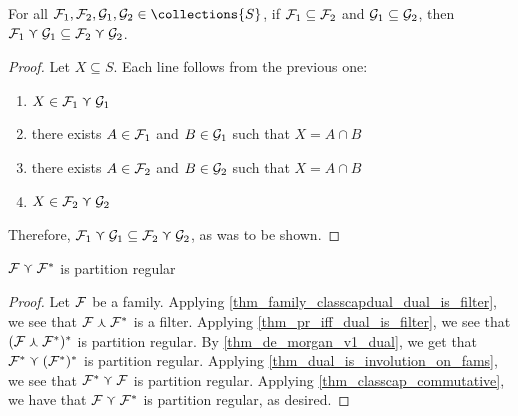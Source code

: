 \begin{theorem}
    \label{thm_classcap_monotone}
    For all $\family_1, \family_2, \familytwo_1, \familytwo_2 \in \collections{S}$, if $\mathcal{F}_1 \subseteq \mathcal{F}_2$ and $\mathcal{G}_1 \subseteq \mathcal{G}_2$, then $\mathcal{F}_1 \curlyvee \mathcal{G}_1 \subseteq \mathcal{F}_2 \curlyvee \mathcal{G}_2$.
\end{theorem}

\begin{proof}


     Let $X \subseteq S$.  Each line follows from the previous one:
    \begin{enumerate}
        \item $X \in \mathcal{F}_1 \curlyvee \mathcal{G}_1$
        \item there exists $A \in \mathcal{F}_1$ and $B \in \mathcal{G}_1$ such that $X = A \cap B$
        \item there exists $A \in \mathcal{F}_2$ and $B \in \mathcal{G}_2$ such that $X = A \cap B$
        \item $X \in \mathcal{F}_2 \curlyvee \mathcal{G}_2$
    \end{enumerate}
    Therefore, $\mathcal{F}_1 \curlyvee \mathcal{G}_1 \subseteq \mathcal{F}_2 \curlyvee \mathcal{G}_2$, as was to be shown.
\end{proof}

\begin{theorem}
    \label{thm_family_classcap_dual_is_partition_regular}
    $\mathcal{F} \curlyvee \mathcal{F}^*$ is partition regular
\end{theorem}

\begin{proof}
    Let $\mathcal{F}$ be a family. Applying \cref{thm_family_classcapdual_dual_is_filter}, we see that $\mathcal{F} \curlywedge \mathcal{F}^*$ is a filter.  Applying \cref{thm_pr_iff_dual_is_filter}, we see that $(\mathcal{F} \curlywedge \mathcal{F}^*)^*$ is partition regular.  By \cref{thm_de_morgan_v1_dual}, we get that $\mathcal{F}^* \curlyvee (\mathcal{F}^*)^*$ is partition regular.  Applying \cref{thm_dual_is_involution_on_fams}, we see that $\mathcal{F}^* \curlyvee \mathcal{F}$ is partition regular.  Applying \cref{thm_classcap_commutative}, we have that $\mathcal{F} \curlyvee \mathcal{F}^*$ is partition regular, as desired.
\end{proof}


